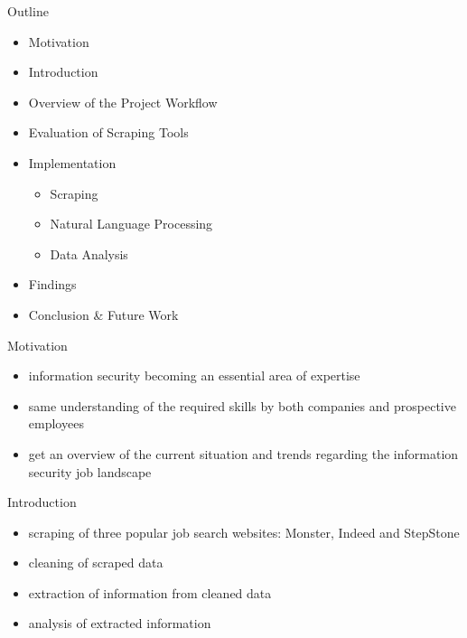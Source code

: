 \documentclass[aspectratio=169]{beamer}
\institute{supervised by Irdin Pekaric}
\begin{document}
  \maketitle

  \begin{frame}{Outline}
    \begin{itemize}
      \item Motivation
      \item Introduction
      \item Overview of the Project Workflow
      \item Evaluation of Scraping Tools
      \item Implementation
      \begin{itemize}
        \item Scraping
        \item Natural Language Processing
        \item Data Analysis
      \end{itemize}
      \item Findings
      \item Conclusion \& Future Work
    \end{itemize}
  \end{frame}

  \begin{frame}{Motivation}
    \begin{itemize}
      \item information security becoming an essential area of expertise
      \item same understanding of the required skills by both companies and prospective employees
      \item get an overview of the current situation and trends regarding the information security job landscape
    \end{itemize}
  \end{frame}

  \begin{frame}{Introduction}
    \begin{itemize}
      \item scraping of three popular job search websites: Monster, Indeed and StepStone
      \item cleaning of scraped data
      \item extraction of information from cleaned data
      \item analysis of extracted information
    \end{itemize}
  \end{frame}
\end{document}
